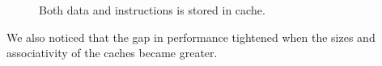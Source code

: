 \documentclass[titlepage, a4paper]{article}
\begin{document}
\begin{figure}[H]
	\centering
	\caption{Both data and instructions is stored in cache.}
	\label{fig:unified-cache}
\end{figure}

We also noticed that the gap in performance tightened when the sizes and associativity of the caches became greater.
\end{document}
